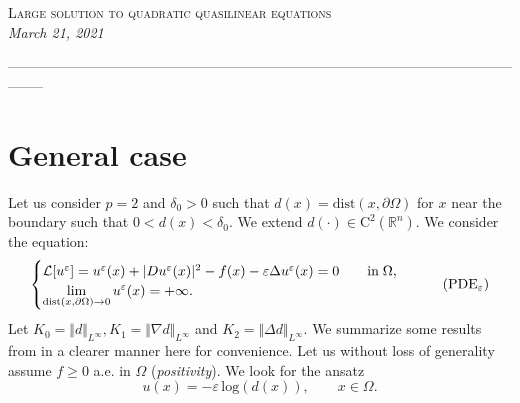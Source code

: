 \documentclass[10pt]{article}
\newcommand{\setfont}[2]{{\fontfamily{#1}\selectfont #2}}
\theoremstyle{plain}
\theoremstyle{remark}
\begin{document}
\begin{center}
{\LARGE \textsc{Large solution to quadratic quasilinear equations}}\\
{\textit{March 21, 2021}}
\end{center}



\begin{center}
--------------------------------------------------------------------------------------------------------------------
\end{center}


\section{General case}
Let us consider $p = 2$ and $\delta_0>0$ such that $d(x) = \mathrm{dist}(x,\partial\Omega)$ for $x$ near the boundary such that $0<d(x)<\delta_0$. We extend $d(\cdot)\in \mathrm{C}^2(\mathbb{R}^n)$. We consider the equation:
\begin{equation}\label{eq:PDEeps}
    \begin{cases}
   \mathcal{L}[u^\varepsilon] =  u^\varepsilon(x) + |Du^\varepsilon(x)|^2 - f(x) - \varepsilon \Delta u^\varepsilon(x) = 0 \qquad
    \text{in}\;\Omega, \vspace{0cm}\\
    \displaystyle  \lim_{\mathrm{dist}(x,\partial \Omega)\to 0} u^\varepsilon(x) = +\infty.
    \end{cases} \tag{PDE$_\varepsilon$}
\end{equation}
Let $K_0 = \Vert d\Vert_{L^\infty}, K_1 = \Vert\nabla d\Vert_{L^\infty}$ and $K_2 = \Vert \Delta d\Vert_{L^\infty}$. We summarize some results from \cite{Lasry1989} in a clearer manner here for convenience. Let us without loss of generality assume $f\geq 0$ a.e. in $\Omega$ (\textit{positivity}). We look for the ansatz
\begin{equation*}
    u(x) = -\varepsilon\,\mathrm{log}(d(x)), \qquad x\in \Omega.
\end{equation*}
\end{document}
